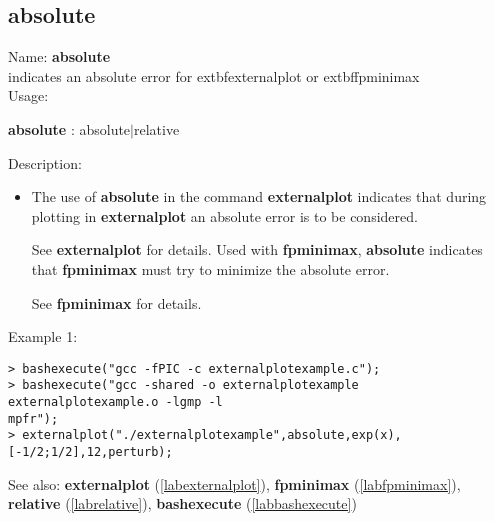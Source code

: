 \subsection{absolute}
\label{lababsolute}
\noindent Name: \textbf{absolute}\\
indicates an absolute error for 	extbf{externalplot} or 	extbf{fpminimax}\\
\noindent Usage: 
\begin{center}
\textbf{absolute} : \textsf{absolute$|$relative}
\end{center}
\noindent Description: \begin{itemize}

\item The use of \textbf{absolute} in the command \textbf{externalplot} indicates that during
   plotting in \textbf{externalplot} an absolute error is to be considered.
    
   See \textbf{externalplot} for details.
   Used with \textbf{fpminimax}, \textbf{absolute} indicates that \textbf{fpminimax} must try to minimize
   the absolute error.
    
   See \textbf{fpminimax} for details.
\end{itemize}
\noindent Example 1: 
\begin{center}\begin{minipage}{15cm}\begin{Verbatim}[frame=single]
> bashexecute("gcc -fPIC -c externalplotexample.c");
> bashexecute("gcc -shared -o externalplotexample externalplotexample.o -lgmp -l
mpfr");
> externalplot("./externalplotexample",absolute,exp(x),[-1/2;1/2],12,perturb);
\end{Verbatim}
\end{minipage}\end{center}
See also: \textbf{externalplot} (\ref{labexternalplot}), \textbf{fpminimax} (\ref{labfpminimax}), \textbf{relative} (\ref{labrelative}), \textbf{bashexecute} (\ref{labbashexecute})

